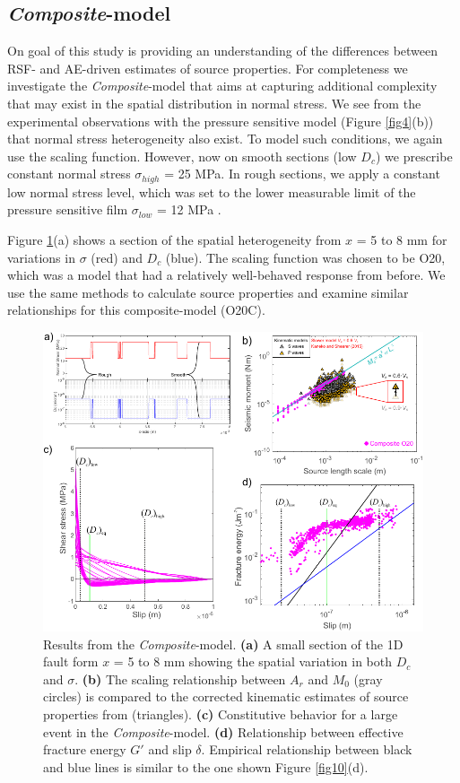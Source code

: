 \documentclass[preprint,1p, 10pt,authoryear]{elsarticle}
\begin{document}
\subsection{\textit{Composite}-model}
On goal of this study is providing an understanding of the differences between RSF- and AE-driven estimates of source properties. For completeness we investigate the \textit{Composite}-model that aims at capturing additional complexity that may exist in the spatial distribution in normal stress. We see from the experimental observations with the pressure sensitive model (Figure \ref{fig4}(b)) that normal stress heterogeneity also exist. To model such conditions, we again use the scaling function. However, now on smooth sections (low $D_{c}$) we prescribe constant normal stress $\sigma_{high}$ = 25 MPa.  In rough sections, we apply a constant low normal stress level, which was set to the lower measurable limit of the pressure sensitive film $\sigma_{low}$ = 12 MPa \citep{Selvadurai2015a}. 

Figure \ref{fig12}(a) shows a section of the spatial heterogeneity from $x$ =  5 to 8 mm for variations in $\sigma$ (red) and $D_{c}$ (blue).  The scaling function was chosen to be O20, which was a model that had a relatively well-behaved response from before.  We use the same methods to calculate source properties and examine similar relationships for this composite-model (O20C).

\begin{figure}
	\centering
	\includegraphics{FIG12_revised.pdf} 
	\caption{Results from the \textit{Composite}-model. \textbf{(a)} A small section of the 1D fault form $x$ = 5 to 8 mm showing the spatial variation in both $D_{c}$ and $\sigma$. \textbf{(b)} The scaling relationship between $A_{r}$ and $M_{0}$ (gray circles) is compared to the corrected kinematic estimates of source properties from \citet{Selvadurai2019} (triangles).   \textbf{(c)} Constitutive behavior for a large event in the \textit{Composite}-model. \textbf{(d)} Relationship between effective fracture energy $G'$ and slip $\delta$. Empirical relationship between black and blue lines is similar to the one shown Figure \ref{fig10}(d).}
	\label{fig12}
\end{figure}
\end{document}
